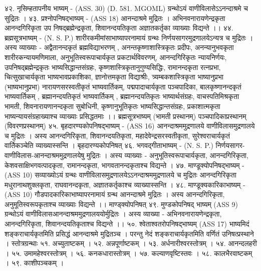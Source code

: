 ४२. नृसिम्हतापनीय भाष्यम् - (ASS. 30)
(D. 581. MGOML) ग्रन्थोऽयं वाणीविलासेऽऽनन्दाश्रमे च सुद्रितः ।
४३. प्रश्नोपनिषद्भाष्यम् - (ASS 18)
आनन्दाश्रमे मुद्रितः । अभिनवनारायणेन्द्रकृता आनन्दगिरिकृता उप निषद्ब्रह्मेन्द्रकृता, शिवानन्दयतिकृता अज्ञातकर्तृका व्याख्याः विद्यन्ते ।।
४४. ब्रह्मसूत्रभाष्यम् - (N. S. P.)
शारीरकमीमांसाभाष्यापरनामायं ग्रन्थः निर्णयसागरमुद्रणालयेऽन्यत्र च मुद्रितः । अस्य व्याख्याः - अद्वैतानन्दकृतं ब्रह्मविद्याभरणम् , अनन्तकृष्णाशास्त्रिकृतः प्रदीपः, अनन्यानुभवकृता शारीरकन्यायमणिमाला, अनुभूतिस्वरूपाचार्यकृत प्रकटार्थविवरणम्, आनन्दगिरिकृतः न्यायनिर्णयः, उपनिषद्ब्रह्मेन्द्रकृतः भाष्यसिद्धान्तसंग्रहः, कृष्णशास्त्रिकृतानुगुण्यसिद्धिः, रामानन्दकृता रत्नप्रभा, चित्सुखाचार्यकृता भाष्यभावप्रकाशिका, ज्ञानोत्तमकृता विद्याश्रीः, त्र्यम्बकशास्त्रिकृता भाष्यानुप्रभा (भाष्यभानुप्रभा) नारायणसरस्वतीकृतं भाष्यवार्तिकम्, पद्मपादाचार्यकृता पञ्चपादिका, बालकृष्णानन्दकृतं भाष्यवार्तिकम् , ब्रह्मानन्दयतिकृतं भाष्यवार्तिकम् , ब्रह्मानन्दयतिकृतः भाष्यार्थसंग्रहः, वाचस्पतिमिश्रकृता भामती, शिवनारायणानन्दकृता सुबोधिनी, कृष्णानुभूतिकृतः भाष्यसिद्धान्तसंग्रहः, प्रकाशात्मकृता भाष्यन्यायसंग्रहाख्याश्च व्याख्याः प्रसिद्धतमाः ।।
ब्रह्मसूत्रभाष्यम् (भामती प्रस्थानम्)
पञ्चपादिकाप्रस्थानम् (विवरणप्रस्थानम्)
४५. बृहदारण्यकोपनिषद्भाष्यम् - (ASS 16)
आनन्दाश्रममुद्रणालये वाणीविलासमुद्रणालये च मुद्रितः । अस्य आनन्दगिरिकृता, शिवानन्दयतिकृता, महादेवेन्द्रसरस्वतीकृता, सुरेश्वराचार्यकृतं वार्तिकञ्चेति व्याख्यास्सन्ति ।
बृहदारण्यकोपनिषत्
४६. भगवद्गीताभाष्यम् - (N. S. P.)
निर्णयसागर-वाणीविलास-आनन्दाश्रममुद्रणालयेषु मुद्रितः । अस्य व्याख्याः - अनुभूतिस्वरूपाचार्यकृता, आनन्दगिरिकृता, केशवसाक्षिभगवत्पादकृता, रामानन्दकृता, भागवतानन्दकृताश्च विद्यन्ते ।
४७. माण्डूक्योपनिषद्भाष्यम् - (ASS 10) 
सव्याख्योऽयं ग्रन्थः वाणीविलासमुद्रणालयेऽऽनन्दाश्रममुद्रणालये च मुद्रितः आनन्दगिरिकृता मधुरानाथशुक्लकृता, राघवानन्दकृता, अज्ञातकर्तृकाश्च व्याख्यास्सन्ति ।
४८. माण्डूक्यकारिकाभाष्यम् - (ASS 10)
गौडपादकारिकाभाष्यापरनामायं ग्रन्थ आनन्दाश्रमे मुद्रितः । अस्य आनन्दगिरिकृता, अनुमूतिस्वरूपकृताश्च व्याख्याः विद्यन्ते ।।
माण्ड्क्योपनिषत्
४९. मुण्डकोपनिषद् भाष्यम् (ASS 9)
ग्रन्थोऽयं वाणीविलासआनन्दाश्रममुद्रणालययोर्मुद्रितः । अस्य व्याख्या - अभिनवनारायणेन्द्रकृता, आनन्दगिरिकृता, शिवानन्दयतिकृताश्च विद्यन्ते ।।
५०. श्वेताश्वतरोपनिषद्भाष्यम् (ASS 17)
भाष्यमिदं शङ्कराचार्यकृतमिति प्रसिद्धं आनन्दाश्रमे मुद्रितञ्च । परन्तु नेदं शङ्कराचार्यकृतमिति वर्णितं उनिषत्प्रस्थाने ।
स्तोत्रग्रन्थाः
५१. अच्युताष्टकम् ।
५२. अन्नपूर्णाष्टकम् ।
५३. अर्धनारीश्वरस्तोत्रम् ।
५४. आनन्दलहरी ।
५५. उमामहेश्वरस्तोत्रम् ।
५६. कनकधारास्तोत्रम् ।
५७. कल्याणवृष्टिस्तवः ।
५८. कालभैरवाष्टकम् ।
५९. काशीपञ्चकम् ।
